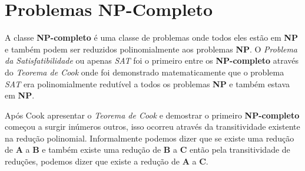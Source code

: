\section{Problemas NP-Completo}

A classe \textbf{NP-completo} é uma classe de problemas onde todos eles estão em \textbf{NP} e também podem ser reduzidos polinomialmente aos problemas \textbf{NP}. 
O \textit{Problema da Satisfatibilidade} ou apenas \textit{SAT} foi o primeiro entre os \textbf{NP-completo} através do \textit{Teorema de Cook} onde foi demonstrado matematicamente que o problema \textit{SAT} era polinomialmente redutível a todos os problemas \textbf{NP} e também estava em \textbf{NP}.

Após Cook apresentar o \textit{Teorema de Cook} e demostrar o primeiro \textbf{NP-completo} começou a surgir inúmeros outros, isso ocorreu através da transitividade existente na redução polinomial. Informalmente podemos dizer que se existe uma redução de \textbf{A} a \textbf{B} e também existe uma redução de \textbf{B} a \textbf{C} então pela transitividade de reduções,  podemos dizer que existe a redução de \textbf{A} a \textbf{C}. 
